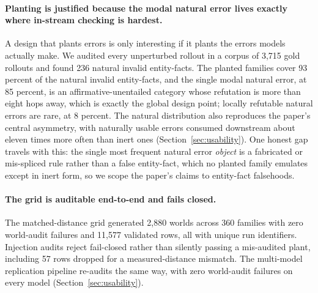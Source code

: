 \paragraph{Planting is justified because the modal natural error lives
exactly where in-stream checking is hardest.} A design that plants errors
is only interesting if it plants the errors models actually make. We
audited every unperturbed rollout in a corpus of 3{,}715 gold rollouts and
found 236 natural invalid entity-facts.
The planted families cover 93 percent of the natural invalid entity-facts,
and the single modal natural error, at 85 percent, is an
affirmative-unentailed category whose refutation is more than eight hops
away, which is exactly the global design point; locally refutable natural
errors are rare, at 8 percent.
The natural distribution also reproduces the paper's central asymmetry,
with naturally usable errors consumed downstream about eleven times more
often than inert ones (Section~\ref{sec:usability}).
One honest gap travels with this: the single most frequent natural error
\emph{object} is a fabricated or mis-spliced rule rather than a false
entity-fact, which no planted family emulates except in inert form, so we
scope the paper's claims to entity-fact falsehoods.

\paragraph{The grid is auditable end-to-end and fails closed.} The
matched-distance grid generated 2{,}880 worlds across 360 families with zero
world-audit failures and 11{,}577 validated rows, all with unique run
identifiers. Injection audits reject fail-closed rather than silently
passing a mis-audited plant, including 57 rows dropped for a
measured-distance mismatch.
The multi-model replication pipeline re-audits the same way, with zero
world-audit failures on every model (Section~\ref{sec:usability}).

